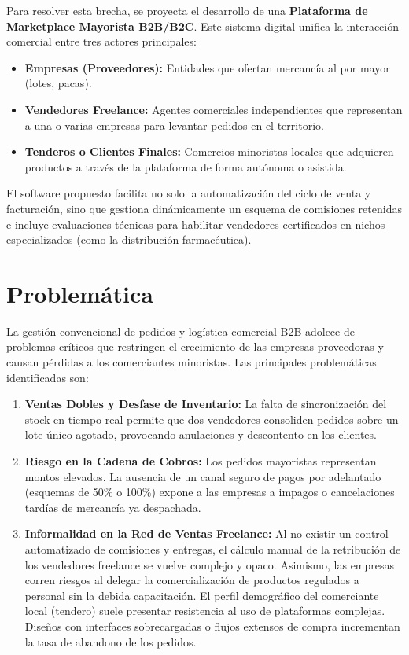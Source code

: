 \documentclass[12pt,spanish,a4paper]{report}
\begin{document}
Para resolver esta brecha, se proyecta el desarrollo de una \textbf{Plataforma de Marketplace Mayorista B2B/B2C}. Este sistema digital unifica la interacción comercial entre tres actores principales:
\begin{itemize}
    \item \textbf{Empresas (Proveedores):} Entidades que ofertan mercancía al por mayor (lotes, pacas).
    \item \textbf{Vendedores Freelance:} Agentes comerciales independientes que representan a una o varias empresas para levantar pedidos en el territorio.
    \item \textbf{Tenderos o Clientes Finales:} Comercios minoristas locales que adquieren productos a través de la plataforma de forma autónoma o asistida.
\end{itemize}
El software propuesto facilita no solo la automatización del ciclo de venta y facturación, sino que gestiona dinámicamente un esquema de comisiones retenidas e incluye evaluaciones técnicas para habilitar vendedores certificados en nichos especializados (como la distribución farmacéutica).

\section{Problemática}
La gestión convencional de pedidos y logística comercial B2B adolece de problemas críticos que restringen el crecimiento de las empresas proveedoras y causan pérdidas a los comerciantes minoristas. Las principales problemáticas identificadas son:
\begin{enumerate}
    \item \textbf{Ventas Dobles y Desfase de Inventario:} La falta de sincronización del stock en tiempo real permite que dos vendedores consoliden pedidos sobre un lote único agotado, provocando anulaciones y descontento en los clientes.
    \item \textbf{Riesgo en la Cadena de Cobros:} Los pedidos mayoristas representan montos elevados. La ausencia de un canal seguro de pagos por adelantado (esquemas de 50\% o 100\%) expone a las empresas a impagos o cancelaciones tardías de mercancía ya despachada.
    \item \textbf{Informalidad en la Red de Ventas Freelance:} Al no existir un control automatizado de comisiones y entregas, el cálculo manual de la retribución de los vendedores freelance se vuelve complejo y opaco. Asimismo, las empresas corren riesgos al delegar la comercialización de productos regulados a personal sin la debida capacitación.
     El perfil demográfico del comerciante local (tendero) suele presentar resistencia al uso de plataformas complejas. Diseños con interfaces sobrecargadas o flujos extensos de compra incrementan la tasa de abandono de los pedidos.
\end{enumerate}
\end{document}
